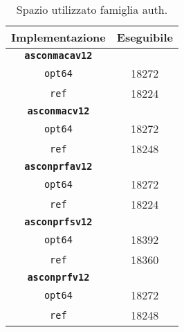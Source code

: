 \begin{table}[h]
    \caption{Spazio utilizzato famiglia auth.}
    \centering
    \begin{tabular}{|c|c|}
        \hline
        \textbf{Implementazione} & \textbf{Eseguibile} \\
        \hline
        \texttt{\textbf{asconmacav12}} & \\
        \hline
        \texttt{opt64} & 18272 \\
        \hline
        \texttt{ref} & 18224 \\
        \hline
        \texttt{\textbf{asconmacv12}} & \\
        \hline
        \texttt{opt64} & 18272 \\
        \hline
        \texttt{ref} & 18248 \\
        \hline
        \texttt{\textbf{asconprfav12}} & \\
        \hline
        \texttt{opt64} & 18272 \\
        \hline
        \texttt{ref} & 18224 \\
        \hline
        \texttt{\textbf{asconprfsv12}} & \\
        \hline
        \texttt{opt64} & 18392 \\
        \hline
        \texttt{ref} & 18360 \\
        \hline
        \texttt{\textbf{asconprfv12}} & \\
        \hline
        \texttt{opt64} & 18272 \\
        \hline
        \texttt{ref} & 18248 \\
        \hline
    \end{tabular}
\end{table}

